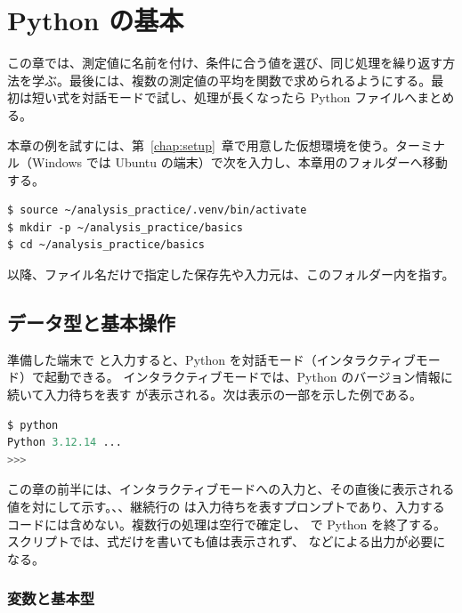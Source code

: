 \chapter{Python の基本}
\label{chap:basics}

この章では、測定値に名前を付け、条件に合う値を選び、同じ処理を繰り返す方法を学ぶ。最後には、複数の測定値の平均を関数で求められるようにする。最初は短い式を対話モードで試し、処理が長くなったら Python ファイルへまとめる。

本章の例を試すには、第~\ref{chap:setup}~章で用意した仮想環境を使う。ターミナル（Windows では Ubuntu の端末）で次を入力し、本章用のフォルダーへ移動する。

\begin{lstlisting}[numbers=none, xleftmargin=2\zw]
$ source ~/analysis_practice/.venv/bin/activate
$ mkdir -p ~/analysis_practice/basics
$ cd ~/analysis_practice/basics
\end{lstlisting}

以降、ファイル名だけで指定した保存先や入力元は、このフォルダー内を指す。

\section{データ型と基本操作}

準備した端末で  と入力すると、Python を対話モード（インタラクティブモード）で起動できる。
インタラクティブモードでは、Python のバージョン情報に続いて入力待ちを表す \code{>>>} が表示される。次は表示の一部を示した例である。

\begin{lstlisting}[language=Python, numbers=none, xleftmargin=2\zw]
$ python
Python 3.12.14 ...
>>>
\end{lstlisting}

この章の前半には、インタラクティブモードへの入力と、その直後に表示される値を対にして示す。\code{\$}、\code{>>>}、継続行の  は入力待ちを表すプロンプトであり、入力するコードには含めない。複数行の処理は空行で確定し、 で Python を終了する。スクリプトでは、式だけを書いても値は表示されず、 などによる出力が必要になる。

\subsection{変数と基本型}

